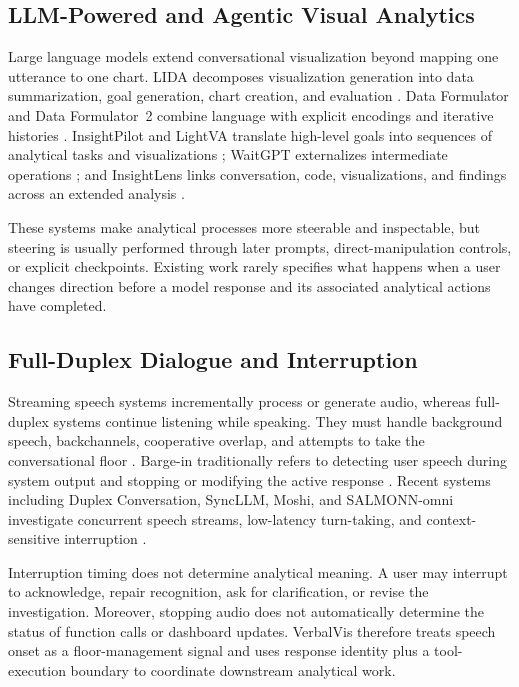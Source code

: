 \documentclass[journal]{IEEEtran}
\begin{document}
\subsection{LLM-Powered and Agentic Visual Analytics}
\label{sec:rw-agentic}

Large language models extend conversational visualization beyond mapping one utterance to one chart. LIDA decomposes visualization generation into data summarization, goal generation, chart creation, and evaluation \cite{dibia2023lida}. Data Formulator and Data Formulator~2 combine language with explicit encodings and iterative histories \cite{wang2024dataformulator,wang2024dataformulator2}. InsightPilot and LightVA translate high-level goals into sequences of analytical tasks and visualizations \cite{ma2023insightpilot,zhao2024lightva}; WaitGPT externalizes intermediate operations \cite{xie2024waitgpt}; and InsightLens links conversation, code, visualizations, and findings across an extended analysis \cite{weng2025insightlens}.

These systems make analytical processes more steerable and inspectable, but steering is usually performed through later prompts, direct-manipulation controls, or explicit checkpoints. Existing work rarely specifies what happens when a user changes direction before a model response and its associated analytical actions have completed.

\subsection{Full-Duplex Dialogue and Interruption}
\label{sec:rw-duplex}

Streaming speech systems incrementally process or generate audio, whereas full-duplex systems continue listening while speaking. They must handle background speech, backchannels, cooperative overlap, and attempts to take the conversational floor \cite{skantze2021turntaking}. Barge-in traditionally refers to detecting user speech during system output and stopping or modifying the active response \cite{heins1997bargein}. Recent systems including Duplex Conversation, SyncLLM, Moshi, and SALMONN-omni investigate concurrent speech streams, low-latency turn-taking, and context-sensitive interruption \cite{lin2022duplex,veluri2024syncllm,defossez2024moshi,yu2025salmonnomni}.

Interruption timing does not determine analytical meaning. A user may interrupt to acknowledge, repair recognition, ask for clarification, or revise the investigation. Moreover, stopping audio does not automatically determine the status of function calls or dashboard updates. VerbalVis therefore treats speech onset as a floor-management signal and uses response identity plus a tool-execution boundary to coordinate downstream analytical work.
\end{document}
